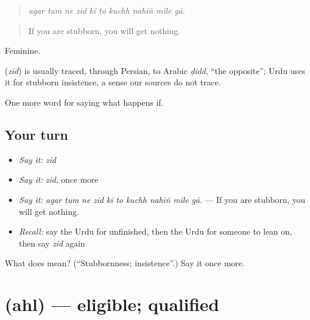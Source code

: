 \begin{quote}
         
\end{quote}

\begin{quote}
\emph{agar tum ne zid kī to kuchh nahīṅ mile gā.}
\end{quote}

\begin{quote}
If you are stubborn, you will get nothing.
\end{quote}

Feminine.

\begin{cousinweb}
\textbf{} (\emph{zid}) is usually traced, through Persian, to Arabic \emph{ḍidd}, \textquotedblleft{}the opposite\textquotedblright{}; Urdu uses it for stubborn insistence, a sense our sources do not trace.
\end{cousinweb}

\begin{grammarlens}[title={What you've built}]
One more word for saying what happens if.
\end{grammarlens}

\subsection*{Your turn}
\begin{itemize}
\raggedright
  \item \emph{Say it:} \emph{zid}
  \item \emph{Say it:} \emph{zid}, once more
  \item \emph{Say it:} \emph{agar tum ne zid kī to kuchh nahīṅ mile gā.} — If you are stubborn, you will get nothing.
  \item \emph{Recall:} say the Urdu for unfinished, then the Urdu for someone to lean on, then say \emph{zid} again
\end{itemize}

\begin{tcolorbox}[breakable,colback=teal!4,colframe=teal!35!black,title={Before you move on}]
What does  mean? (\textquotedblleft{}Stubbornness; insistence\textquotedblright{}.) Say it once more.
\end{tcolorbox}
\section[\texorpdfstring{\ur{اہل} (ahl)}{اہل (ahl)}]{ (ahl) — eligible; qualified}

